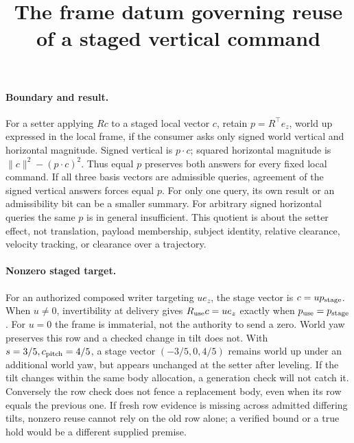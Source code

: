 \documentclass{article}
\title{The frame datum governing reuse of a staged vertical command}
\begin{document}
\maketitle

\paragraph{Boundary and result.}
For a setter applying \(Rc\) to a staged local vector \(c\), retain \(p=R^\top e_z\), world up expressed in the local frame, if the consumer asks only signed world vertical and horizontal magnitude. Signed vertical is \(p\cdot c\); squared horizontal magnitude is \(\lVert c\rVert^2-(p\cdot c)^2\). Thus equal \(p\) preserves both answers for every fixed local command. If all three basis vectors are admissible queries, agreement of the signed vertical answers forces equal \(p\). For only one query, its own result or an admissibility bit can be a smaller summary. For arbitrary signed horizontal queries the same \(p\) is in general insufficient. This quotient is about the setter effect, not translation, payload membership, subject identity, relative clearance, velocity tracking, or clearance over a trajectory.

\paragraph{Nonzero staged target.}
For an authorized composed writer targeting \(u e_z\), the stage vector is \(c=u p_{\rm stage}\). When \(u\ne0\), invertibility at delivery gives \(R_{\rm use}c=u e_z\) exactly when \(p_{\rm use}=p_{\rm stage}\). For \(u=0\) the frame is immaterial, not the authority to send a zero. World yaw preserves this row and a checked change in tilt does not. With \(s=3/5,c_{\rm pitch}=4/5\), a stage vector \((-3/5,0,4/5)\) remains world up under an additional world yaw, but appears unchanged at the setter after leveling. If the tilt changes within the same body allocation, a generation check will not catch it. Conversely the row check does not fence a replacement body, even when its row equals the previous one. If fresh row evidence is missing across admitted differing tilts, nonzero reuse cannot rely on the old row alone; a verified bound or a true hold would be a different supplied premise.
\end{document}
